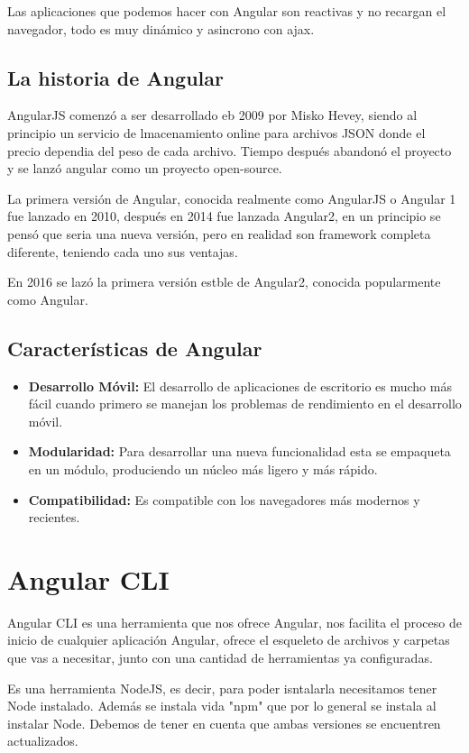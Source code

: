 \documentclass[openany]{book}
\begin{document}
Las aplicaciones que podemos hacer con Angular son reactivas y no recargan el navegador, todo es muy dinámico y asincrono con ajax. 

\section{La historia de Angular}
AngularJS comenzó a ser desarrollado eb 2009 por Misko Hevey, siendo al principio un servicio de lmacenamiento online para archivos JSON donde el precio dependia del peso de cada archivo. Tiempo después abandonó el proyecto y se lanzó angular como un proyecto open-source.

La primera versión de Angular, conocida realmente como AngularJS o Angular 1 fue lanzado en 2010, después en 2014 fue lanzada Angular2, en un principio se pensó que seria una nueva versión, pero en realidad son framework completa diferente, teniendo cada uno sus ventajas. 

En 2016 se lazó la primera versión estble de Angular2, conocida popularmente como Angular. 

\section{Características de Angular}
\begin{itemize}
\item \textbf{Desarrollo Móvil:} El desarrollo de aplicaciones de escritorio es mucho más fácil cuando primero se manejan los problemas de rendimiento en el desarrollo móvil.
\item \textbf{Modularidad:} Para desarrollar una nueva funcionalidad esta se empaqueta en un módulo, produciendo un núcleo más ligero y más rápido.
\item \textbf{Compatibilidad:} Es compatible con los navegadores más modernos y recientes.
\end{itemize}
\chapter{Angular CLI}
Angular CLI es una herramienta que nos ofrece Angular, nos facilita el proceso de inicio de cualquier aplicación Angular, ofrece el esqueleto de archivos y carpetas que vas a necesitar, junto con una cantidad de herramientas ya configuradas.  

Es una herramienta NodeJS, es decir, para poder isntalarla necesitamos tener Node instalado. Además se instala vida "npm" que por lo general se instala al instalar Node. Debemos de tener en cuenta que ambas versiones se encuentren actualizados. 
\end{document}
